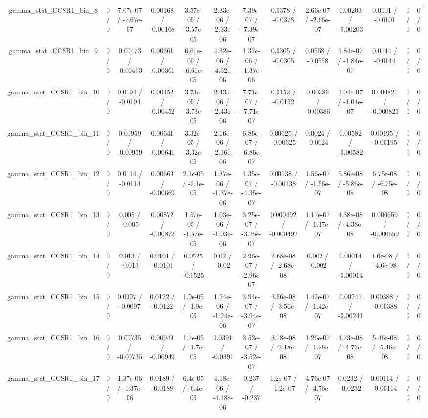 \documentclass[10pt]{article}
\begin{document}
\begin{table}[htbp]
\begin{center}
\begin{tabular}{|c|c|c|c|c|c|c|c|c|c|c|c|c|}
  gamma_stat_CCSR1_bin_8 & 0 / 0 & 7.67e-07 / -7.67e-07 & 0.00168 / -0.00168 & 3.57e-05 / -3.57e-05 & 2.33e-06 / -2.33e-06 & 7.39e-07 / -7.39e-07 & 0.0378 / -0.0378 & 2.66e-07 / -2.66e-07 & 0.00203 / -0.00203 & 0.0101 / -0.0101 & 0 / 0 & 0 / 0 \\ 
  gamma_stat_CCSR1_bin_9 & 0 / 0 & 0.00473 / -0.00473 & 0.00361 / -0.00361 & 6.61e-05 / -6.61e-05 & 4.32e-06 / -4.32e-06 & 1.37e-06 / -1.37e-06 & 0.0305 / -0.0305 & 0.0558 / -0.0558 & 1.84e-07 / -1.84e-07 & 0.0144 / -0.0144 & 0 / 0 & 0 / 0 \\ 
  gamma_stat_CCSR1_bin_10 & 0 / 0 & 0.0194 / -0.0194 & 0.00452 / -0.00452 & 3.73e-05 / -3.73e-05 & 2.43e-06 / -2.43e-06 & 7.71e-07 / -7.71e-07 & 0.0152 / -0.0152 & 0.00386 / -0.00386 & 1.04e-07 / -1.04e-07 & 0.000821 / -0.000821 & 0 / 0 & 0 / 0 \\ 
  gamma_stat_CCSR1_bin_11 & 0 / 0 & 0.00959 / -0.00959 & 0.00641 / -0.00641 & 3.32e-05 / -3.32e-05 & 2.16e-06 / -2.16e-06 & 6.86e-07 / -6.86e-07 & 0.00625 / -0.00625 & 0.0024 / -0.0024 & 0.00582 / -0.00582 & 0.00195 / -0.00195 & 0 / 0 & 0 / 0 \\ 
  gamma_stat_CCSR1_bin_12 & 0 / 0 & 0.0114 / -0.0114 & 0.00669 / -0.00669 & 2.1e-05 / -2.1e-05 & 1.37e-06 / -1.37e-06 & 4.35e-07 / -4.35e-07 & 0.00138 / -0.00138 & 1.56e-07 / -1.56e-07 & 5.86e-08 / -5.86e-08 & 6.75e-08 / -6.75e-08 & 0 / 0 & 0 / 0 \\ 
  gamma_stat_CCSR1_bin_13 & 0 / 0 & 0.005 / -0.005 & 0.00872 / -0.00872 & 1.57e-05 / -1.57e-05 & 1.03e-06 / -1.03e-06 & 3.25e-07 / -3.25e-07 & 0.000492 / -0.000492 & 1.17e-07 / -1.17e-07 & 4.38e-08 / -4.38e-08 & 0.000659 / -0.000659 & 0 / 0 & 0 / 0 \\ 
  gamma_stat_CCSR1_bin_14 & 0 / 0 & 0.013 / -0.013 & 0.0101 / -0.0101 & 0.0525 / -0.0525 & 0.02 / -0.02 & 2.96e-07 / -2.96e-07 & 2.68e-08 / -2.68e-08 & 0.002 / -0.002 & 0.00014 / -0.00014 & 4.6e-08 / -4.6e-08 & 0 / 0 & 0 / 0 \\ 
  gamma_stat_CCSR1_bin_15 & 0 / 0 & 0.0097 / -0.0097 & 0.0122 / -0.0122 & 1.9e-05 / -1.9e-05 & 1.24e-06 / -1.24e-06 & 3.94e-07 / -3.94e-07 & 3.56e-08 / -3.56e-08 & 1.42e-07 / -1.42e-07 & 0.00241 / -0.00241 & 0.00388 / -0.00388 & 0 / 0 & 0 / 0 \\ 
  gamma_stat_CCSR1_bin_16 & 0 / 0 & 0.00735 / -0.00735 & 0.00949 / -0.00949 & 1.7e-05 / -1.7e-05 & 0.0391 / -0.0391 & 3.52e-07 / -3.52e-07 & 3.18e-08 / -3.18e-08 & 1.26e-07 / -1.26e-07 & 4.73e-08 / -4.73e-08 & 5.46e-08 / -5.46e-08 & 0 / 0 & 0 / 0 \\ 
  gamma_stat_CCSR1_bin_17 & 0 / 0 & 1.37e-06 / -1.37e-06 & 0.0189 / -0.0189 & 6.4e-05 / -6.4e-05 & 4.18e-06 / -4.18e-06 & 0.237 / -0.237 & 1.2e-07 / -1.2e-07 & 4.76e-07 / -4.76e-07 & 0.0232 / -0.0232 & 0.00114 / -0.00114 & 0 / 0 & 0 / 0 \\ 

\end{tabular}
\end{center}
\end{table}
\end{document}
